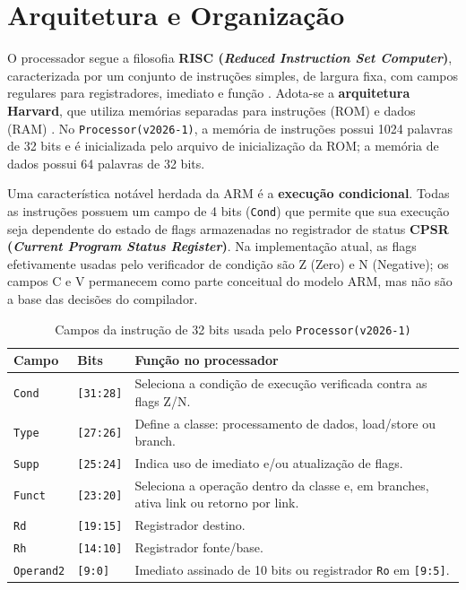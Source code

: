 \documentclass[
	12pt,				%
	oneside,
	a4paper,			%
	english,			%
	french,				%
	spanish,			%
	brazil,				%
	]{abntex2}
\begin{document}
\section{Arquitetura e Organização}

O processador segue a filosofia \textbf{RISC (\emph{Reduced Instruction Set Computer})}, caracterizada por um conjunto de instruções simples, de largura fixa, com campos regulares para registradores, imediato e função \cite{patterson2017,stallings2017}. Adota-se a \textbf{arquitetura Harvard}, que utiliza memórias separadas para instruções (ROM) e dados (RAM) \cite{compOrgDes,compArchi}. No \texttt{Processor(v2026-1)}, a memória de instruções possui 1024 palavras de 32 bits e é inicializada pelo arquivo de inicialização da ROM; a memória de dados possui 64 palavras de 32 bits.

Uma característica notável herdada da ARM é a \textbf{execução condicional}. Todas as instruções possuem um campo de 4 bits (\texttt{Cond}) que permite que sua execução seja dependente do estado de flags armazenadas no registrador de status \textbf{CPSR (\emph{Current Program Status Register})}. Na implementação atual, as flags efetivamente usadas pelo verificador de condição são Z (Zero) e N (Negative); os campos C e V permanecem como parte conceitual do modelo ARM, mas não são a base das decisões do compilador.

\begin{table}[H]
    \centering
    \ABNTEXfontereduzida
    \caption{Campos da instrução de 32 bits usada pelo \texttt{Processor(v2026-1)}}
    \label{tab:campos_instrucao_processor}
    \begin{tabular}{|p{}|p{}|p{}|}
        \hline
        \textbf{Campo} & \textbf{Bits} & \textbf{Função no processador} \\
        \hline
        \texttt{Cond} & \texttt{[31:28]} & Seleciona a condição de execução verificada contra as flags Z/N. \\
        \hline
        \texttt{Type} & \texttt{[27:26]} & Define a classe: processamento de dados, load/store ou branch. \\
        \hline
        \texttt{Supp} & \texttt{[25:24]} & Indica uso de imediato e/ou atualização de flags. \\
        \hline
        \texttt{Funct} & \texttt{[23:20]} & Seleciona a operação dentro da classe e, em branches, ativa link ou retorno por link. \\
        \hline
        \texttt{Rd} & \texttt{[19:15]} & Registrador destino. \\
        \hline
        \texttt{Rh} & \texttt{[14:10]} & Registrador fonte/base. \\
        \hline
        \texttt{Operand2} & \texttt{[9:0]} & Imediato assinado de 10 bits ou registrador \texttt{Ro} em \texttt{[9:5]}. \\
        \hline
    \end{tabular}
\end{table}
\end{document}
